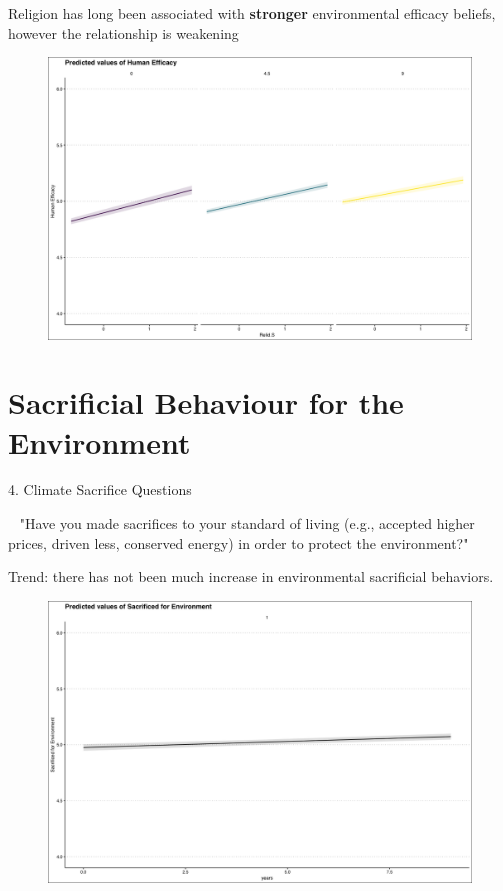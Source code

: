 \documentclass{beamer}
\begin{document}
\begin{frame}{Religion has long been associated with {\bf stronger} environmental efficacy beliefs, however the relationship is weakening}
\begin{figure}
\includegraphics[width=.8\textwidth,height=\textheight,keepaspectratio]{Figures/EFFICACY_RELIDS_T.png}
\end{figure}
\end{frame}


\section{Sacrificial Behaviour for the Environment}
\begin{frame}{4. Climate Sacrifice Questions}
    

\begin{alertblock}{~}
"Have you made sacrifices to your standard of living (e.g., accepted higher prices, driven less, conserved energy) in order to protect the environment?"
\end{alertblock}


\end{frame}



\begin{frame}{Trend: there has not been much increase in environmental sacrificial behaviors.}
\begin{figure}
\includegraphics[width=.8\textwidth,height=\textheight,keepaspectratio]{Figures/SACRIFICEMADE_TIME.png}
\end{figure}
\end{frame}
\end{document}
